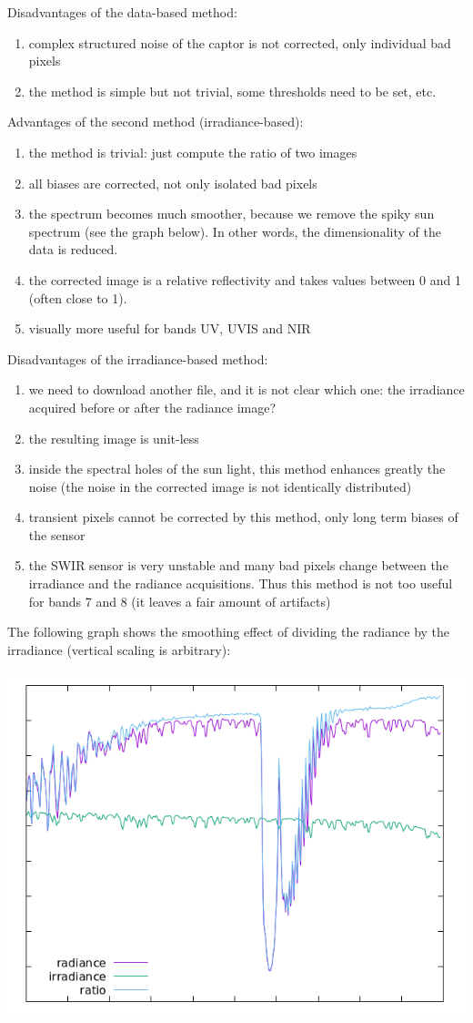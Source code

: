 \documentclass[a4paper]{article}    %
\theoremstyle{note}
\theoremstyle{plain}
\begin{document}
Disadvantages of the data-based method:

\begin{enumerate}
	\item complex structured noise of the captor is not corrected, only
		individual bad pixels
	\item the method is simple but not trivial, some thresholds need to be set,
		etc.
\end{enumerate}


Advantages of the second method (irradiance-based):

\begin{enumerate}
	\item the method is trivial: just compute the ratio of two images
	\item all biases are corrected, not only isolated bad pixels
	\item the spectrum becomes much smoother, because we remove the spiky sun
		spectrum (see the graph below).  In other words, the dimensionality of
		the data is reduced.
	\item the corrected image is a relative reflectivity and takes values
		between 0 and 1 (often close to 1).
	\item visually more useful for bands UV, UVIS and NIR
\end{enumerate}

Disadvantages of the irradiance-based method:

\begin{enumerate}
	\item we need to download another file, and it is not clear which one: the
		irradiance acquired before or after the radiance image?
	\item the resulting image is unit-less
	\item inside the spectral holes of the sun light, this method enhances
		greatly the noise (the noise in the corrected image is not identically
		distributed)
	\item transient pixels cannot be corrected by this method, only long term
		biases of the sensor
	\item the SWIR sensor is very unstable and many bad pixels change between
		the irradiance and the radiance acquisitions.  Thus this method is not
		too useful for bands 7 and 8 (it leaves a fair amount of artifacts)
\end{enumerate}

The following graph shows the smoothing effect of dividing the radiance by
the irradiance (vertical scaling is arbitrary):

\includegraphics[width=\linewidth]{f/pixelratio.png}
\end{document}
